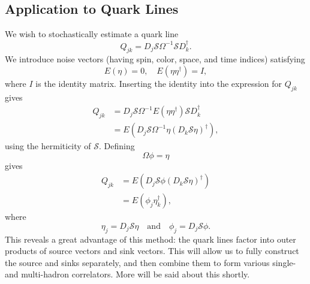 \subsection{Application to Quark Lines}
We wish to stochastically estimate a quark line
\begin{equation}
    Q_{j k}=D_{j} \mathcal{S} \Omega^{-1} \mathcal{S} D_{k}^{\dagger}.
\end{equation}
We introduce noise vectors (having spin, color, space, and time indices) satisfying
\begin{equation}
    E(\eta)=0, \quad E\left(\eta \eta^{\dagger}\right)=I,
\end{equation}
where $I$ is the identity matrix. Inserting the identity into the expression for $Q_{jk}$ gives
\begin{equation}
    \begin{aligned}
        Q_{j k} &=D_{j} \mathcal{S} \Omega^{-1} E\left(\eta \eta^{\dagger}\right) \mathcal{S} D_{k}^{\dagger} \\
        &=E\left(D_{j} \mathcal{S} \Omega^{-1} \eta\left(D_{k} \mathcal{S} \eta\right)^{\dagger}\right),
        \end{aligned}
\end{equation}
using the hermiticity of $\mathcal S$. Defining
\begin{equation}
    \Omega \phi=\eta
\end{equation}
gives
\begin{equation}
    \begin{aligned}
        Q_{j k} &=E\left(D_{j} \mathcal{S} \phi\left(D_{k} \mathcal{S} \eta\right)^{\dagger}\right) \\
        &=E\left(\phi_{j} \eta_{k}^{\dagger}\right),
        \end{aligned}
\end{equation}
where
\begin{equation}
    \eta_{j}=D_{j} \mathcal{S} \eta\quad \text{and}\quad \phi_{j}=D_{j} \mathcal{S} \phi.
\end{equation}
This reveals a great advantage of this method: the quark lines factor into outer products of source vectors and sink vectors. This will allow us to fully construct the source and sinks separately, and then combine them to form various single- and multi-hadron correlators. More will be said about this shortly.

